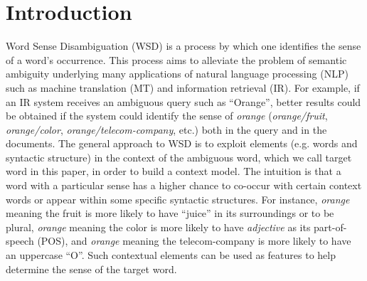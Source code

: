 \documentclass[english]{jnlp_1.4}
\begin{document}
\maketitle
\vspace{0.5\baselineskip}

\section{Introduction\label{sec:Introduction}}

Word Sense Disambiguation (WSD) is a process by which one identifies
the sense of a word's occurrence. This process aims to alleviate the
problem of semantic ambiguity underlying many applications of natural
language processing (NLP) such as machine translation (MT) and information
retrieval (IR). For example, if an IR system receives an ambiguous
query such as {}``Orange'', better results could be obtained if
the system could identify the sense of \emph{orange} (\emph{orange/fruit},
\emph{orange/color}, \emph{orange/telecom-company}, etc.) both in
the query and in the documents. 
\pagebreak
The general approach to WSD is to
exploit elements (e.g. words and syntactic structure) in the context
of the ambiguous word, which we call target word in this paper, in
order to build a context model. The intuition is that a word with
a particular sense has a higher chance to co-occur with certain context
words or appear within some specifi{}c syntactic structures. For instance,
\emph{orange} meaning the fruit is more likely to have ``juice''
in its surroundings or to be plural, \emph{orange} meaning the color
is more likely to have \emph{adjective} as its part-of-speech
(POS), and \emph{orange} meaning the telecom-company is more likely
to have an uppercase {}``O''. Such contextual elements can be used
as features to help determine the sense of the target word.
\end{document}
